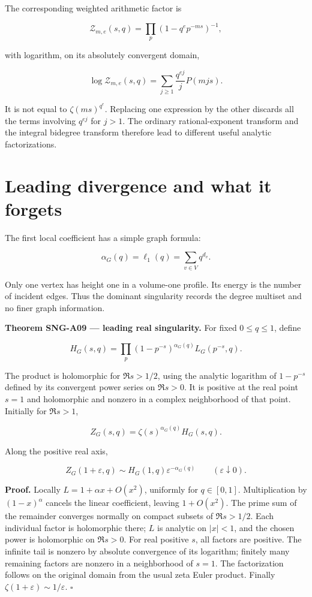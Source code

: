 \documentclass[
  11pt,
  a4paper,
]{report}
\begin{document}
The corresponding weighted arithmetic factor is

\[
 \mathcal Z_{m,e}(s,q)=\prod_p(1-q^ep^{-ms})^{-1},
\]

with logarithm, on its absolutely convergent domain,

\[
 \log\mathcal Z_{m,e}(s,q)
 =\sum_{j\ge1}\frac{q^{ej}}jP(mjs).
\]

It is not equal to \(\zeta(ms)^{q^e}\). Replacing one expression by the
other discards all the terms involving \(q^{ej}\) for \(j>1\). The
ordinary rational-exponent transform and the integral bidegree transform
therefore lead to different useful analytic factorizations.

\hypertarget{leading-divergence-and-what-it-forgets}{%
\section{Leading divergence and what it
forgets}\label{leading-divergence-and-what-it-forgets}}

The first local coefficient has a simple graph formula:

\[
 \alpha_G(q)=\ell_1(q)=\sum_{v\in V}q^{d_v}.
\]

Only one vertex has height one in a volume-one profile. Its energy is
the number of incident edges. Thus the dominant singularity records the
degree multiset and no finer graph information.

\textbf{Theorem SNG-A09 --- leading real singularity.} For fixed
\(0\le q\le1\), define

\[
 H_G(s,q)=\prod_p(1-p^{-s})^{\alpha_G(q)}L_G(p^{-s},q).
 \tag{6.6}
\]

The product is holomorphic for \(\Re s>1/2\), using the analytic
logarithm of \(1-p^{-s}\) defined by its convergent power series on
\(\Re s>0\). It is positive at the real point \(s=1\) and holomorphic
and nonzero in a complex neighborhood of that point. Initially for
\(\Re s>1\),

\[
 Z_G(s,q)=\zeta(s)^{\alpha_G(q)}H_G(s,q).
\]

Along the positive real axis,

\[
 Z_G(1+\varepsilon,q)
 \sim H_G(1,q)\varepsilon^{-\alpha_G(q)}
 \qquad(\varepsilon\downarrow0).
 \tag{6.7}
\]

\textbf{Proof.} Locally \(L=1+\alpha x+O(x^2)\), uniformly for
\(q\in[0,1]\). Multiplication by \((1-x)^\alpha\) cancels the linear
coefficient, leaving \(1+O(x^2)\). The prime sum of the remainder
converges normally on compact subsets of \(\Re s>1/2\). Each individual
factor is holomorphic there; \(L\) is analytic on \(|x|<1\), and the
chosen power is holomorphic on \(\Re s>0\). For real positive \(s\), all
factors are positive. The infinite tail is nonzero by absolute
convergence of its logarithm; finitely many remaining factors are
nonzero in a neighborhood of \(s=1\). The factorization follows on the
original domain from the usual zeta Euler product. Finally
\(\zeta(1+\varepsilon)\sim1/\varepsilon\). \(\square\)
\end{document}

